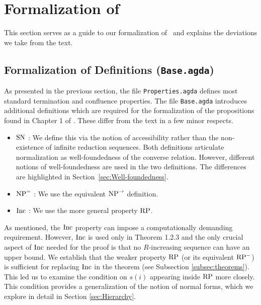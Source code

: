 \section{Formalization of \terese}
\label{sec:Formalization}
This section serves as a guide to our formalization of \terese $\,$ and explains the deviations we take from the text.

\subsection{Formalization of Definitions (\texttt{Base.agda})}\label{subsec:def}

As presented in the previous section, the file \texttt{Properties.agda} defines most standard termination and confluence properties. The file \texttt{Base.agda} introduces additional definitions which are required for the formalization of the propositions found in Chapter 1 of \terese.
These differ from the text in a few minor respects.
\begin{itemize}
    \item $\mathrm{SN}$ : We define this via the notion of accessibility rather than the non-existence of infinite reduction sequences. Both definitions articulate normalization as well-foundedness of the converse relation. However, different notions of well-foundedness are used in the two definitions. The differences are highlighted in Section~\ref{sec:Well-foundedness}.
    \item $\mathrm{NP}^{=}$ : We use the equivalent $\mathrm{NP}^{\to}$ definition.
    \item $\mathrm{Inc}$ : We use the more general property $\mathrm{RP}$.
\end{itemize}

As mentioned, the $\mathrm{Inc}$ property can impose a computationally demanding requirement. However, $\mathrm{Inc}$ is used only in Theorem 1.2.3
and the only crucial aspect of $\mathrm{Inc}$ needed for the proof is that no $R$-increasing
sequence can have an upper bound.
We establish that the weaker property $\mathrm{RP}$ (or its equivalent $\mathrm{RP^{-}}$) is sufficient for replacing $\mathrm{Inc}$ in the theorem (see Subsection \ref{subsec:theorems}).
This led us to examine the condition on $s (i)$ appearing inside $\mathrm{RP}$ more closely. This condition provides a generalization of the notion of normal forms,
which we explore in detail in Section \ref{sec:Hierarchy}.


